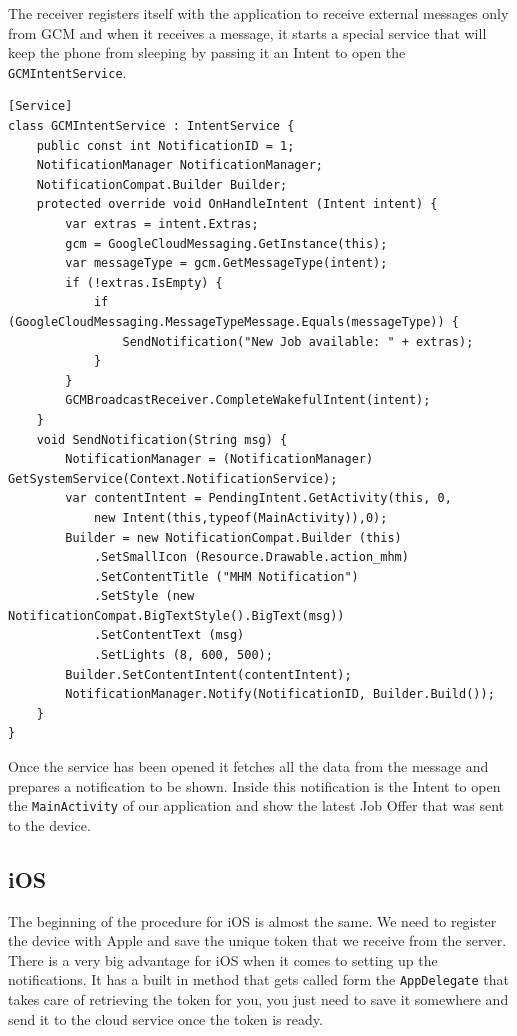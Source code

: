 The receiver registers itself with the application to receive external messages only from \ac{GCM} and when it receives a message, it starts a special service that will keep the phone from sleeping by passing it an Intent to open the \texttt{GCMIntentService}.

\begin{lstlisting}[frame=lt,caption=GCMIntentService.cs, label={list:reg_and_serv}]
[Service]
class GCMIntentService : IntentService {
	public const int NotificationID = 1;
	NotificationManager NotificationManager;
	NotificationCompat.Builder Builder;
	protected override void OnHandleIntent (Intent intent) {
		var extras = intent.Extras;
		gcm = GoogleCloudMessaging.GetInstance(this);
		var messageType = gcm.GetMessageType(intent);
		if (!extras.IsEmpty) {
			if (GoogleCloudMessaging.MessageTypeMessage.Equals(messageType)) {
				SendNotification("New Job available: " + extras);
			}
		}
		GCMBroadcastReceiver.CompleteWakefulIntent(intent);
	}
	void SendNotification(String msg) {
		NotificationManager = (NotificationManager) GetSystemService(Context.NotificationService);
		var contentIntent = PendingIntent.GetActivity(this, 0,
			new Intent(this,typeof(MainActivity)),0);
		Builder = new NotificationCompat.Builder (this)
			.SetSmallIcon (Resource.Drawable.action_mhm)
			.SetContentTitle ("MHM Notification")
			.SetStyle (new NotificationCompat.BigTextStyle().BigText(msg))
			.SetContentText (msg)
			.SetLights (8, 600, 500);
		Builder.SetContentIntent(contentIntent);
		NotificationManager.Notify(NotificationID, Builder.Build());
	}
}
\end{lstlisting}

Once the service has been opened it fetches all the data from the message and prepares a notification to be shown. Inside this notification is the Intent to open the \texttt{MainActivity} of our application and show the latest Job Offer that was sent to the device. 

\subsection{iOS}  

The beginning of the procedure for iOS is almost the same. We need to register the device with Apple and save the unique token that we receive from the server. There is a very big advantage for iOS when it comes to setting up the notifications. It has a built in method that gets called form the \texttt{AppDelegate} that takes care of retrieving the token for you, you just need to save it somewhere and send it to the cloud service once the token is ready.

